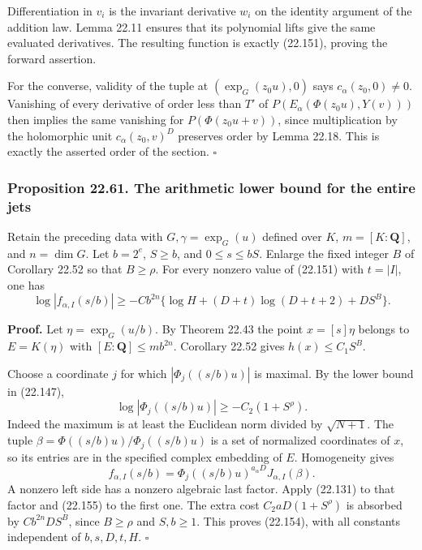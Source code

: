 \documentclass[
  11pt,
  a4paper,
]{article}
\begin{document}
Differentiation in \(v_i\) is the invariant derivative \(w_i\) on the
identity argument of the addition law. Lemma 22.11 ensures that its
polynomial lifts give the same evaluated derivatives. The resulting
function is exactly (22.151), proving the forward assertion.

For the converse, validity of the tuple at \((\exp_G(z_0u),0)\) says
\(c_\alpha(z_0,0)\ne0\). Vanishing of every derivative of order less
than \(T'\) of \(P(E_\alpha(\Phi(z_0u),Y(v)))\) then implies the same
vanishing for \(P(\Phi(z_0u+v))\), since multiplication by the
holomorphic unit \(c_\alpha(z_0,v)^D\) preserves order by Lemma 22.18.
This is exactly the asserted order of the section. \(\square\)

\subsubsection{Proposition 22.61. The arithmetic lower bound for the
entire
jets}\label{proposition-22.61.-the-arithmetic-lower-bound-for-the-entire-jets}

Retain the preceding data with \(G,\gamma=\exp_G(u)\) defined over
\(K\), \(m=[K:\mathbf Q]\), and \(n=\dim G\). Let \(b=2^e\), \(S\ge b\),
and \(0\le s\le bS\). Enlarge the fixed integer \(B\) of Corollary 22.52
so that \(B\ge\rho\). For every nonzero value of (22.151) with
\(t=|I|\), one has \[
 \log|f_{\alpha,I}(s/b)|
 \ge-C b^{2n}
 \{\log H+(D+t)\log(D+t+2)+DS^B\}.
 \tag{22.154}
\]

\textbf{Proof.} Let \(\eta=\exp_G(u/b)\). By Theorem 22.43 the point
\(x=[s]\eta\) belongs to \(E=K(\eta)\) with
\([E:\mathbf Q]\le m b^{2n}\). Corollary 22.52 gives
\(h(x)\le C_1 S^B\).

Choose a coordinate \(j\) for which \(|\Phi_j((s/b)u)|\) is maximal. By
the lower bound in (22.147), \[
 \log|\Phi_j((s/b)u)|\ge-C_2(1+S^\rho).
 \tag{22.155}
\] Indeed the maximum is at least the Euclidean norm divided by
\(\sqrt{N+1}\). The tuple \(\beta=\Phi((s/b)u)/\Phi_j((s/b)u)\) is a set
of normalized coordinates of \(x\), so its entries are in the specified
complex embedding of \(E\). Homogeneity gives \[
 f_{\alpha,I}(s/b)
 =\Phi_j((s/b)u)^{a_\alpha D}J_{\alpha,I}(\beta).
 \tag{22.156}
\] A nonzero left side has a nonzero algebraic last factor. Apply
(22.131) to that factor and (22.155) to the first one. The extra cost
\(C_2aD(1+S^\rho)\) is absorbed by \(C b^{2n}DS^B\), since \(B\ge\rho\)
and \(S,b\ge1\). This proves (22.154), with all constants independent of
\(b,s,D,t,H\). \(\square\)
\end{document}
